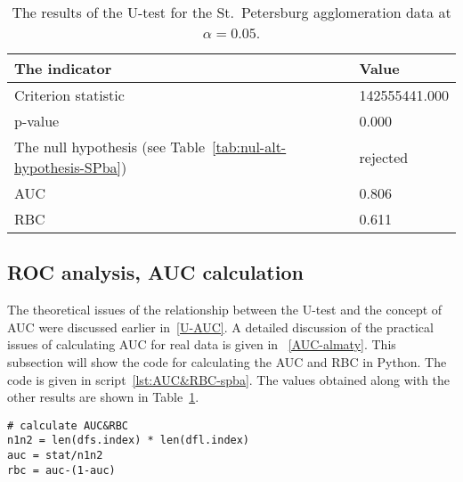 \documentclass[]{scrreprt}
\begin{document}
%
\begin{table}[htp]
	\caption{The results of the U-test for the St.~Petersburg agglomeration data at $\alpha=0.05$.}\label{tab:u-test-py-result}
	\centering
	\begin{tabular}{ll}
		\hline
		The indicator&Value\\
		\hline
		Criterion statistic&142555441.000\\
		\hline
		p-value&0.000\\
		\hline
		The null hypothesis (see Table~\ref{tab:nul-alt-hypothesis-SPba})&rejected\\
		\hline
		AUC&0.806\\
		\hline
		RBC&0.611\\
		\hline
	\end{tabular}
\end{table}
%
\subsection{ROC analysis, AUC calculation}
The theoretical issues of the relationship between the U-test and the concept of AUC were discussed earlier in~\ref{U-AUC}. A detailed discussion of the practical issues of calculating AUC for real data is given in ~\ref{AUC-almaty}. This subsection will show the code for calculating the AUC and RBC in Python. The code is given in script~\ref{lst:AUC&RBC-spba}. The values obtained along with the other results are shown in Table~\ref{tab:u-test-py-result}.
%
\begin{lstlisting}[float, caption = Calculation of AUC and RBC for St.~Petersburg agglomeration data, firstnumber=1, label= lst:AUC&RBC-spba]
# calculate AUC&RBC
n1n2 = len(dfs.index) * len(dfl.index)
auc = stat/n1n2
rbc = auc-(1-auc)
\end{lstlisting}  
%
\clearpage
%
\nocite{Essential-Statistical-Inference}
\nocite{AUC-optimization}
\nocite{Mann-Whitney-1947}
\nocite{Optimizing-classifier-performance}
\nocite{ROC-R-1}
\nocite{ROC-AUC-1}
\nocite{ROC-AUC-meets-U-R-1}

\printbibliography
\end{document}
